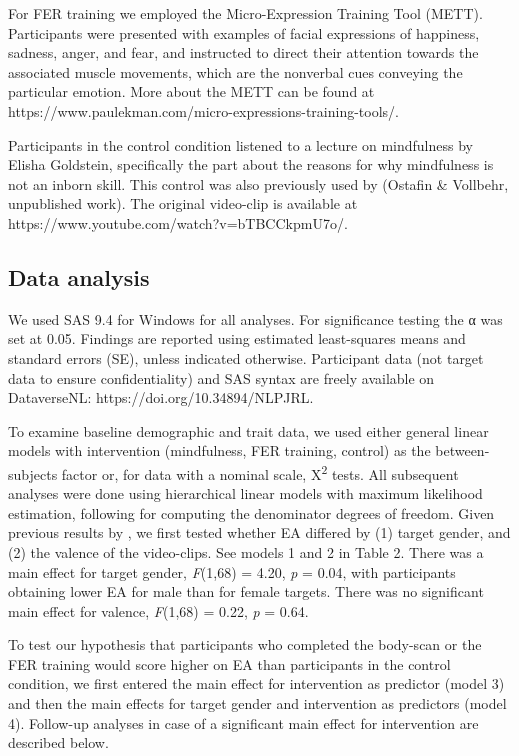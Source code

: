 \documentclass[authordate, empirical]{jote-new-article}
\begin{document}
	For FER training we employed the Micro-Expression Training Tool (METT). Participants were presented with examples of facial expressions of happiness, sadness, anger, and fear, and instructed to direct their attention towards the associated muscle movements, which are the nonverbal cues conveying the particular emotion. More about the METT can be found at https://www.paulekman.com/micro-expressions-training-tools/.



	Participants in the control condition listened to a lecture on mindfulness by Elisha Goldstein, specifically the part about the reasons for why mindfulness is not an inborn skill. This control was also previously used by (Ostafin \& Vollbehr, unpublished work). The original video-clip is available at https://www.youtube.com/watch?v=bTBCCkpmU7o/.



	\subsection{Data analysis}



	We used SAS 9.4 for Windows for all analyses. For significance testing the α was set at 0.05. Findings are reported using estimated least-squares means and standard errors (SE), unless indicated otherwise. Participant data (not target data to ensure confidentiality) and SAS syntax are freely available on DataverseNL: https://doi.org/10.34894/NLPJRL.



	To examine baseline demographic and trait data, we used either general linear models with intervention (mindfulness, FER training, control) as the between-subjects factor or, for data with a nominal scale, X\textsuperscript{2} tests. All subsequent analyses were done using hierarchical linear models with maximum likelihood estimation, following \textcite{Kenward1997} for computing the denominator degrees of freedom. Given previous results by \textcites{aanhetRot2014}, we first tested whether EA differed by (1) target gender, and (2) the valence of the video-clips. See models 1 and 2 in Table 2. There was a main effect for target gender, \emph{F}(1,68) = 4.20, \emph{p} = 0.04, with participants obtaining lower EA for male than for female targets. There was no significant main effect for valence, \emph{F}(1,68) = 0.22, \emph{p} = 0.64.



	To test our hypothesis that participants who completed the body-scan or the FER training would score higher on EA than participants in the control condition, we first entered the main effect for intervention as predictor (model 3) and then the main effects for target gender and intervention as predictors (model 4). Follow-up analyses in case of a significant main effect for intervention are described below.
\end{document}
